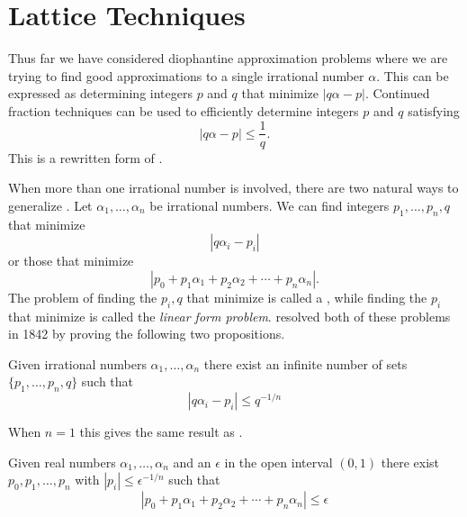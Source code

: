 
\chapter{Lattice Techniques}
\label{Lattice:Chap}

Thus far we have considered diophantine approximation problems where
we are trying to find good approximations to a single irrational
number $\alpha$.  This can be expressed as determining integers $p$
and $q$ that minimize $|q \alpha - p|$.  Continued fraction techniques
can be used to efficiently determine integers $p$ and $q$ satisfying
\begin{equation} \label{1D:Approx:Eq}
\left| q \alpha - p\right| \le \frac{1}{q}.
\end{equation}
This is a rewritten form of .

When more than one irrational number is involved, there are two
natural ways to generalize .  Let $\alpha_1,
\ldots, \alpha_n$ be irrational numbers.  We can find integers $p_{1},
\ldots, p_{n}, q$ that minimize
\begin{equation}
\left| q \alpha_{i} - p_{i} \right|
\label{Simul:Approx:Eq}
\end{equation}
or those that minimize
\begin{equation}
\left|p_0 + p_{1} \alpha_{1} + p_{2} \alpha_{2} + \cdots + p_{n} \alpha_{n} \right|.
\label{Linear:Form:Eq}
\end{equation}
The problem of finding the $p_{i}, q$ that minimize
 is called a , while finding the $p_{i}$ that minimize
 is called the {\em
linear form problem\/}.  {\Dirichlet} resolved both of these problems in
1842 \cite{Dirichlet1842-es} by proving the following two propositions.

\begin{proposition}[{\Dirichlet}] 
\label{Dirichlet:Multiple:Prop}
Given irrational numbers $\alpha_{1}, \ldots, \alpha_{n}$ there exist
an infinite number of sets $\{p_{1}, \ldots, p_{n}, q\}$ such that
\[
\left| q \alpha_{i} - p_{i}\right| \le q^{-1/n}
\]
\end{proposition}

When $n = 1$ this gives the same result as . 

\begin{proposition}[{\Dirichlet}]
\label{Dirichlet:Mutual:Prop}
Given real numbers $\alpha_{1}, \ldots, \alpha_{n}$ and an
$\epsilon$ in the open interval $(0, 1)$ there exist $p_{0}, p_1,
\ldots, p_{n}$ with $\left|p_{i}\right| \le \epsilon^{-1/n}$ such that
\[
\left| p_0 + p_{1} \alpha_{1} + p_{2} \alpha_{2} + \cdots + p_{n} \alpha_{n} \right|
\le \epsilon
\]
\end{proposition}

